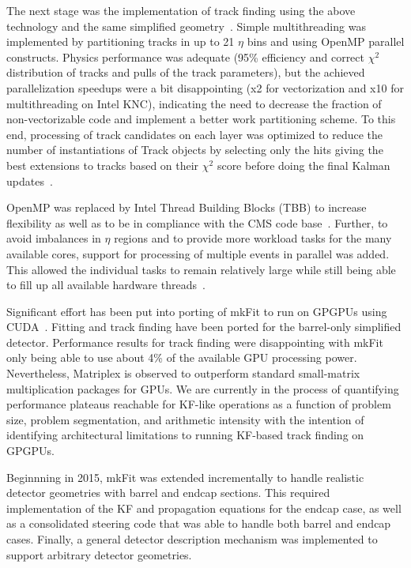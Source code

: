 \documentclass{webofc}
\def\mkfit{mkFit\xspace}
\begin{document}
The next stage was the implementation of track finding using the above
technology and the same simplified geometry~\cite{pkf-finding}. Simple
multithreading was implemented by partitioning tracks in up to 21
$\eta$ bins and using OpenMP parallel constructs. Physics performance was
adequate (95\% efficiency and correct $\chi^2$ distribution of tracks and
pulls of the track parameters), but the achieved parallelization speedups were
a bit disappointing (x2 for vectorization and x10 for multithreading on Intel
KNC), indicating the need to decrease the fraction of non-vectorizable code
and implement a better work partitioning scheme. To this end, processing of
track candidates on each layer was optimized to reduce the number of
instantiations of Track objects by selecting only the hits giving the best
extensions to tracks based on their
$\chi^2$ score before doing the final Kalman updates~\cite{pkf-clone-engine}.

OpenMP was replaced by Intel Thread Building Blocks (TBB) to increase
flexibility as well as to be in compliance with the CMS code
base~\cite{pkf-tbb}. Further, to avoid imbalances in $\eta$ regions and to
provide more workload tasks for the many available cores, support for
processing of multiple events in parallel was added. This allowed the
individual tasks to remain relatively large while still being able to fill up
all available hardware threads~\cite{pkf-acat-17}.

Significant effort has been put into porting of \mkfit to run on GPGPUs using
CUDA~\cite{pkf-gpu}. Fitting and track finding have been ported for the
barrel-only simplified detector. Performance results for track finding were
disappointing with \mkfit only being able to use about 4\% of the available
GPU processing power. Nevertheless, Matriplex is observed to outperform
standard small-matrix multiplication packages for GPUs. We are currently in
the process of quantifying performance plateaus reachable for KF-like
operations as a function of problem size, problem segmentation, and arithmetic
intensity with the intention of identifying architectural limitations to
running KF-based track finding on GPGPUs.

Beginnning in 2015, \mkfit was extended incrementally to handle realistic
detector geometries with barrel and endcap sections. This required
implementation of the KF and propagation equations for the endcap case, as
well as a consolidated steering code that was able to handle both barrel and
endcap cases. Finally, a general detector description mechanism was
implemented to support arbitrary detector geometries.
\end{document}
